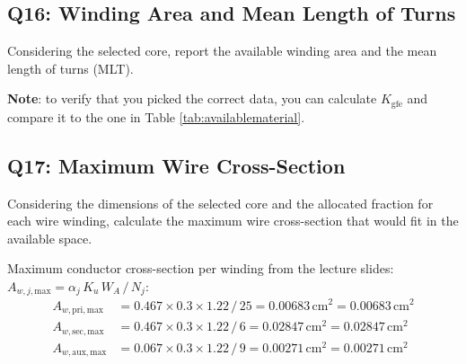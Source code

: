 \documentclass{PELsmallreport}
\begin{document}
 \quad {} \quad {} \hfill{}


\subsection{Q16: Winding Area and Mean Length of Turns}
Considering the selected core, report the available winding area and the mean length of turns (MLT).

\textbf{Note}: to verify that you picked the correct data, you can calculate $K_\mathrm{gfe}$ and compare it to the one in Table \ref{tab:availablematerial}. 


  \qquad  {}\hfill{}







\subsection{Q17: Maximum Wire Cross-Section}
Considering the dimensions of the selected core and the allocated fraction for each wire winding, calculate the maximum wire cross-section that would fit in the available space. 

\begin{framed}
	\vspace{2em}
	Maximum conductor cross-section per winding from the lecture slides: $A_{w,j,\mathrm{max}} = \alpha_j\,K_u\,W_A\,/\,N_j$:
\begin{align}
    A_{w,\mathrm{pri,max}} &= 0.467\times0.3\times1.22\,/\,25 = 0.00683\,\mathrm{cm}^2 = 0.00683\,\mathrm{cm}^2\\
    A_{w,\mathrm{sec,max}} &= 0.467\times0.3\times1.22\,/\,6 = 0.02847\,\mathrm{cm}^2 = 0.02847\,\mathrm{cm}^2\\
    A_{w,\mathrm{aux,max}} &= 0.067\times0.3\times1.22\,/\,9 = 0.00271\,\mathrm{cm}^2 = 0.00271\,\mathrm{cm}^2
\end{align}
	\vspace{2em}
\end{framed}

 \quad {} \quad {} \hfill{}
\end{document}

